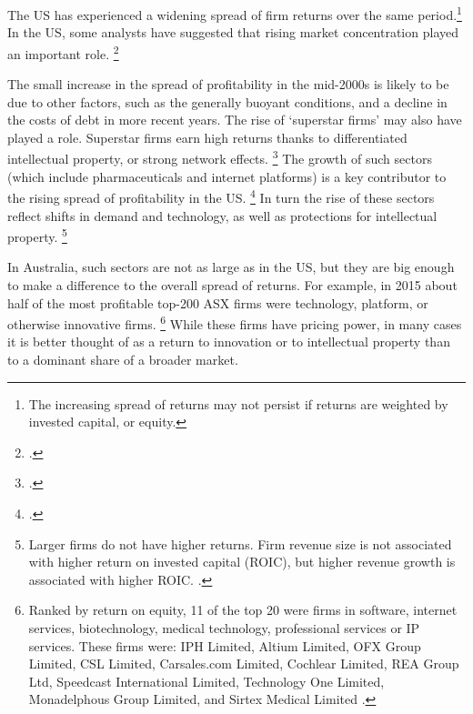 
The US has experienced a widening spread of firm returns over the same period.\footnote{\textcite{Econtoohigh2016} The increasing spread of returns may not persist if returns are weighted by invested capital, or equity.} 
In the US, some analysts have suggested that rising market concentration played an important role.%
    \footcites{CEAcompetitionbriefmay2016}{Ganapati_concen_2017}


The small increase in the spread of profitability in the mid-2000s is likely to be due to other factors, such as the generally buoyant conditions, and a decline in the costs of debt in more recent years. The rise of `superstar firms' may also have played a role. Superstar firms earn high returns thanks to differentiated intellectual property, or strong network effects.%
    \footcites{UNCTAD_2017}{AutorDorn2017}
The growth of such sectors (which include pharmaceuticals and internet platforms) is a key contributor to the rising spread of profitability in the US.%
    \footcite[][71--76]{Koller_ROIC_2010}
In turn the rise of these sectors reflect shifts in demand and technology, as well as protections for intellectual property.%
    \footnote{Larger firms do not have higher returns. Firm revenue size is not associated with higher return on invested capital (ROIC), but higher revenue growth is associated with higher ROIC. \textcite{Koller_ROIC_2010}.}

In Australia, such sectors are not as large as in the US, but they are big enough to make a difference to the overall spread of returns. For example, in 2015 about half of the most profitable top-200 ASX firms were technology, platform, or otherwise innovative firms.%
    \footnote{Ranked by return on equity, 11 of the top 20 were firms in software, internet services, biotechnology, medical technology, professional services or IP services. These firms were: IPH Limited, Altium Limited, OFX Group Limited, CSL Limited, Carsales.com Limited, Cochlear Limited, REA Group Ltd, Speedcast International Limited, Technology One Limited, Monadelphous Group Limited, and Sirtex Medical Limited \parencite{Morningstar2017}.}
While these firms  have pricing power, in many cases it is better thought of as a return to innovation or to intellectual property than to a dominant share of a broader market.%

